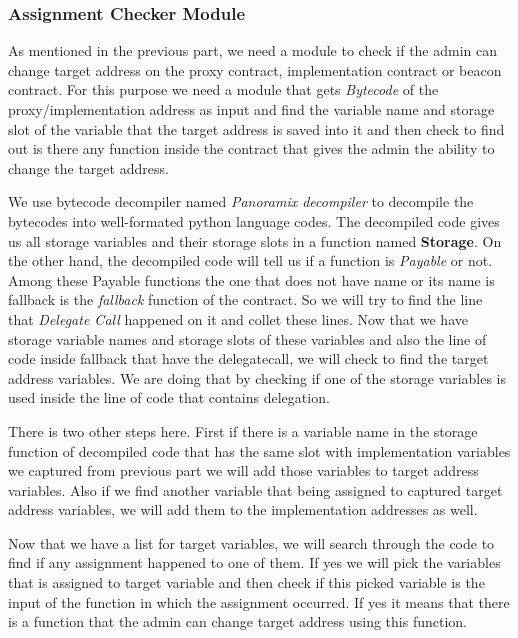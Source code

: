 \subsubsection{Assignment Checker Module}

As mentioned in the previous part, we need a module to check if the admin can change target address on the proxy contract, implementation contract or beacon contract. For this purpose we need a module that gets \textit{{Bytecode}} of the proxy/implementation address as input and find the variable name and storage slot of the variable that the target address is saved into it and then check to find out is there any function inside the contract that gives the admin the ability to change the target address.

We use bytecode decompiler named \textit{Panoramix decompiler} to decompile the bytecodes into well-formated python language codes. The decompiled code gives us all storage variables and their storage slots in a function named \textbf{Storage}. On the other hand, the decompiled code will tell us if a function is \textit{Payable} or not. Among these Payable functions the one that does not have name or its name is fallback is the \textit{fallback} function of the contract. So we will try to find the line that \textit{Delegate Call} happened on it and collet these lines. Now that we have storage variable names and storage slots of these variables and also the line of code inside fallback that have the delegatecall, we will check to find the target address variables. We are doing that by checking if one of the storage variables is used inside the line of code that contains delegation. 

There is two other steps here. First if there is a variable name in the storage function of decompiled code that has the same slot with implementation variables we captured from previous part we will add those variables to target address variables. Also if we find another variable that being assigned to captured target address variables, we will add them to the implementation addresses as well.

Now that we have a list for target variables, we will search through the code to find if any assignment happened to one of them. If yes we will pick the variables that is assigned to target variable and then check if this picked variable is the input of the function in which the assignment occurred. If yes it means that there is a function that the admin can change target address using this function.

